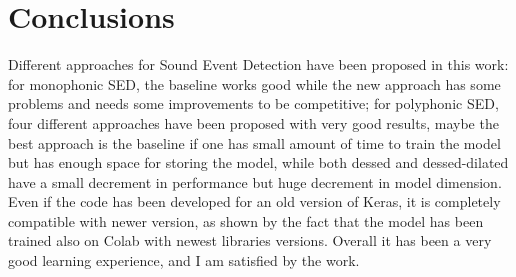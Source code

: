 \documentclass{article}
\begin{document}
\section{Conclusions}
\label{sec:end}

Different approaches for Sound Event Detection have been proposed in this work: for monophonic SED, the baseline works good while the new approach has some problems and needs some improvements to be competitive; for polyphonic SED, four different approaches have been proposed with very good results, maybe the best approach is the baseline if one has small amount of time to train the model but has enough space for storing the model, while both dessed and dessed-dilated have a small decrement in performance but huge decrement in model dimension.\newline
Even if the code has been developed for an old version of Keras, it is completely compatible with newer version, as shown by the fact that the model has been trained also on Colab with newest libraries versions.\newline
Overall it has been a very good learning experience, and I am satisfied by the work.  


%





\end{document}
